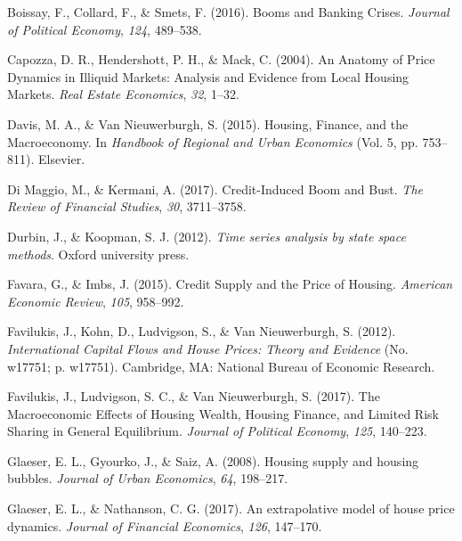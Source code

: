 \documentclass[
  12pt,
]{article}
\newlength{\cslhangindent}
\newlength{\cslentryspacingunit} %
\newenvironment{CSLReferences}[2] %
 {%
  \setlength{\parindent}{0pt}
  \ifodd #1
  \let\oldpar\par
  \def\par{\hangindent=\cslhangindent\oldpar}
  \fi
  \setlength{\parskip}{#2\cslentryspacingunit}
 }%
 {}
\begin{document}
\begin{CSLReferences}{1}{0}
\leavevmode{}%
Boissay, F., Collard, F., \& Smets, F. (2016). Booms and {Banking Crises}. \emph{Journal of Political Economy}, \emph{124}, 489--538.

\leavevmode{}%
Capozza, D. R., Hendershott, P. H., \& Mack, C. (2004). An {Anatomy} of {Price Dynamics} in {Illiquid Markets}: Analysis and {Evidence} from {Local Housing Markets}. \emph{Real Estate Economics}, \emph{32}, 1--32.

\leavevmode{}%
Davis, M. A., \& Van Nieuwerburgh, S. (2015). Housing, {Finance}, and the {Macroeconomy}. In \emph{Handbook of {Regional} and {Urban Economics}} (Vol. 5, pp. 753--811). {Elsevier}.

\leavevmode{}%
Di Maggio, M., \& Kermani, A. (2017). Credit-{Induced Boom} and {Bust}. \emph{The Review of Financial Studies}, \emph{30}, 3711--3758.

\leavevmode{}%
Durbin, J., \& Koopman, S. J. (2012). \emph{Time series analysis by state space methods}. {Oxford university press}.

\leavevmode{}%
Favara, G., \& Imbs, J. (2015). Credit {Supply} and the {Price} of {Housing}. \emph{American Economic Review}, \emph{105}, 958--992.

\leavevmode{}%
Favilukis, J., Kohn, D., Ludvigson, S., \& Van Nieuwerburgh, S. (2012). \emph{International {Capital Flows} and {House Prices}: Theory and {Evidence}} (No. w17751; p. w17751). {Cambridge, MA}: {National Bureau of Economic Research}.

\leavevmode{}%
Favilukis, J., Ludvigson, S. C., \& Van Nieuwerburgh, S. (2017). The {Macroeconomic Effects} of {Housing Wealth}, {Housing Finance}, and {Limited Risk Sharing} in {General Equilibrium}. \emph{Journal of Political Economy}, \emph{125}, 140--223.

\leavevmode{}%
Glaeser, E. L., Gyourko, J., \& Saiz, A. (2008). Housing supply and housing bubbles. \emph{Journal of Urban Economics}, \emph{64}, 198--217.

\leavevmode{}%
Glaeser, E. L., \& Nathanson, C. G. (2017). An extrapolative model of house price dynamics. \emph{Journal of Financial Economics}, \emph{126}, 147--170.


\end{CSLReferences}
\end{document}
